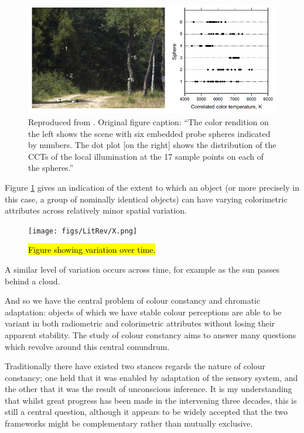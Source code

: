 \begin{figure}[htbp]
\includegraphics[max width=\textwidth]{figs/LitRev/greyballs.png}
\caption{Reproduced from \citet{nascimento_spatial_2014}. Original figure caption: ``The color rendition on the left shows the scene with six embedded probe spheres indicated by numbers. The dot plot [on the right] shows the distribution of the CCTs of the local illumination at the 17 sample points on each of the spheres.''}
\label{fig:greyballs}
\end{figure}

Figure \ref{fig:greyballs} gives an indication of the extent to which an object (or more precisely in this case, a group of nominally identical objects) can have varying colorimetric attributes across relatively minor spatial variation. 
\begin{figure}[htbp]
\texttt{[image: figs/LitRev/X.png]}
\caption{\hl{Figure showing variation over time.}}
\label{fig:X}
\end{figure}

A similar level of variation occurs across time, for example as the sun passes behind a cloud.

And so we have the central problem of colour constancy and chromatic adaptation: objects of which we have stable colour perceptions are able to be variant in both radiometric and colorimetric attributes without losing their apparent stability. The study of colour constancy aims to answer many questions which revolve around this central conundrum.

Traditionally %
there have existed two stances regards the nature of colour constancy; one held that it was enabled by adaptation of the sensory system, and the other that it was the result of unconscious inference. It is my understanding that whilst great progress has been made in the intervening three decades, this is still a central question, although it appears to be widely accepted that the two frameworks might be complementary rather than mutually exclusive. 

